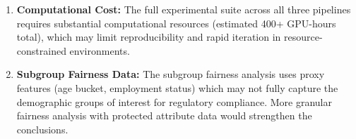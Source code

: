 \begin{enumerate}[label=\arabic*.]
\item \textbf{Computational Cost:} The full experimental suite across all three pipelines requires substantial computational resources (estimated 400+ GPU-hours total), which may limit reproducibility and rapid iteration in resource-constrained environments.

\item \textbf{Subgroup Fairness Data:} The subgroup fairness analysis uses proxy features (age bucket, employment status) which may not fully capture the demographic groups of interest for regulatory compliance. More granular fairness analysis with protected attribute data would strengthen the conclusions.
\end{enumerate}
